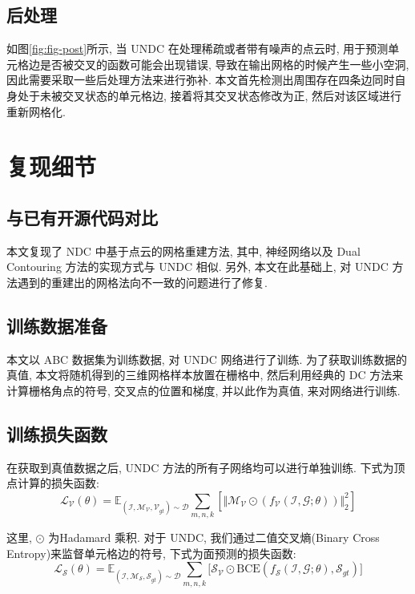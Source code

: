 \subsection{后处理}

如图\ref{fig:fig-post}所示, 当 UNDC 在处理稀疏或者带有噪声的点云时, 用于预测单元格边是否被交叉的函数可能会出现错误, 导致在输出网格的时候产生一些小空洞, 因此需要采取一些后处理方法来进行弥补. 
本文首先检测出周围存在四条边同时自身处于未被交叉状态的单元格边, 接着将其交叉状态修改为正, 然后对该区域进行重新网格化. 

\section{复现细节}

\subsection{与已有开源代码对比}

本文复现了 NDC 中基于点云的网格重建方法, 其中, 神经网络以及 Dual Contouring 方法的实现方式与 UNDC 相似. 
另外, 本文在此基础上, 对 UNDC 方法遇到的重建出的网格法向不一致的问题进行了修复. 

\subsection{训练数据准备}
本文以 ABC 数据集为训练数据, 对 UNDC 网络进行了训练. 
为了获取训练数据的真值, 本文将随机得到的三维网格样本放置在栅格中, 然后利用经典的 DC 方法来计算栅格角点的符号, 交叉点的位置和梯度, 并以此作为真值, 来对网络进行训练. 

\subsection{训练损失函数}

在获取到真值数据之后, UNDC 方法的所有子网络均可以进行单独训练. 
下式为顶点计算的损失函数: 
\begin{equation}
    \mathcal{L_V}(\theta)=\mathbb{E}_{(\mathcal{I, M_V, V}_{gt})\sim \mathcal{D}}\sum _{m,n,k} [ \Vert \mathcal{M_V} \odot (f_{\mathcal{V}}(\mathcal{I,G};\theta)) \Vert ^2_2 ]
\end{equation}

这里, $\odot$ 为Hadamard 乘积. 对于 UNDC, 我们通过二值交叉熵(Binary Cross Entropy)来监督单元格边的符号, 下式为面预测的损失函数:
\begin{equation}
    \mathcal{L_S}(\theta)=\mathbb{E}_{(\mathcal{I, M_S, S}_{gt})\sim \mathcal{D}}\sum_{m,n,k} \lbrack \mathcal{S_V} \odot \mathrm{BCE}(f_\mathcal{S}(\mathcal{I,G};\theta), \mathcal{S}_{gt}) \rbrack
\end{equation}

